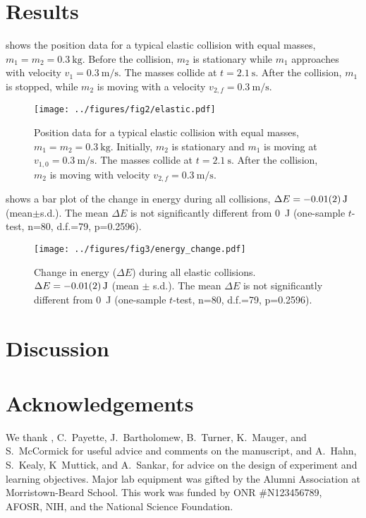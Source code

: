 \documentclass[aps,prl,preprint]{revtex4-1}
\begin{document}
\section{Results}
 shows the position data for a typical elastic collision with equal masses, $m_1=m_2=\qty{0.3}{\kilo\gram}$. Before the collision, $m_2$ is stationary while $m_1$ approaches with velocity $v_1=\qty{0.3}{\meter\per\second}$. The masses collide at $t=\qty{2.1}{\second}$. After the collision, $m_1$ is stopped, while $m_2$ is moving with a velocity $v_{2,f}=\qty{0.3}{\meter\per\second}$. 
\begin{figure}
\begin{center}
\texttt{[image: ../figures/fig2/elastic.pdf]}
\end{center}
\caption{Position data for a typical elastic collision with equal masses, $m_1=m_2=\qty{0.3}{\kilo\gram}$. Initially, $m_2$ is stationary and $m_1$ is moving at $v_{1,0}=\qty{0.3}{\meter\per\second}$. The masses collide at $t=\SI{2.1}{\second}$. After the collision, $m_2$ is moving with velocity $v_{2,f}=\qty{0.3}{\meter\per\second}$. }
\label{fig:results1}
\end{figure}

 shows a bar plot of the change in energy during all collisions, $\Delta E = \qty{-0.01\pm0.02}{\joule}$ (mean$\pm$s.d.). The mean $\Delta E$ is not significantly different from \qty{0}{\joule} (one-sample $t$-test, n=80, d.f.=79, p=0.2596). 
\begin{figure}
\begin{center}
\texttt{[image: ../figures/fig3/energy\_change.pdf]}
\end{center}
\caption{Change in energy ($\Delta E$) during all elastic collisions. $\Delta E = \qty{-0.01\pm0.02}{\joule}$ (mean $\pm$ s.d.). The mean $\Delta E$ is not significantly different from \qty{0}{\joule} (one-sample $t$-test, n=80, d.f.=79, p=0.2596).}
\label{fig:results2}
\end{figure}

\section{Discussion}

\section{Acknowledgements}
We thank , C.~Payette, J.~Bartholomew, B.~Turner, K.~Mauger, and S.~McCormick for useful advice and comments on the manuscript, and A.~Hahn, S.~Kealy, K~Muttick, and A.~Sankar, for advice on the design of experiment and learning objectives. Major lab equipment was gifted by the Alumni Association at Morristown-Beard School. This work was funded by ONR \#N123456789, AFOSR, NIH, and the National Science Foundation. 

\end{document}
